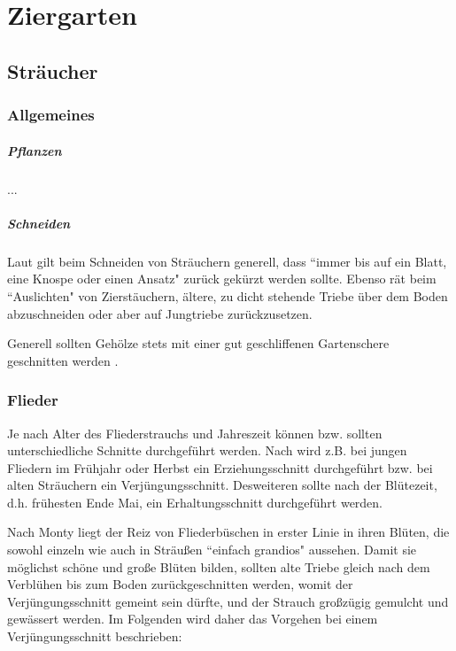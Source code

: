 \chapter{Ziergarten}

\pagebreak

\section{Sträucher}
\label{Sträucher}

\subsection{Allgemeines}

\paragraph{Pflanzen}

...

\paragraph{Schneiden}

Laut \citet[S.~257]{Don2021} gilt beim Schneiden von Sträuchern generell, dass ``immer bis auf ein Blatt, eine Knospe oder einen Ansatz" zurück gekürzt werden sollte.
Ebenso rät \citet[S.~256]{Stangl1995} beim ``Auslichten" von Zierstäuchern, ältere, zu dicht stehende Triebe über dem Boden abzuschneiden oder aber auf Jungtriebe zurückzusetzen.

Generell sollten Gehölze stets mit einer gut geschliffenen Gartenschere geschnitten werden \citep[S.~257]{Don2021}.

\subsection{Flieder}

Je nach Alter des Fliederstrauchs und Jahreszeit können bzw. sollten unterschiedliche Schnitte durchgeführt werden.
Nach \citet{Siemens2021} \cite{Siemens2021} wird z.B. bei jungen Fliedern im Frühjahr oder Herbst ein Erziehungsschnitt durchgeführt bzw. bei alten Sträuchern ein Verjüngungsschnitt.
Desweiteren sollte nach der Blütezeit, d.h. frühesten Ende Mai, ein Erhaltungsschnitt durchgeführt werden.

Nach Monty \citet[S.~258]{Don2021} liegt der Reiz von Fliederbüschen in erster Linie in ihren Blüten, die sowohl einzeln wie auch in Sträußen ``einfach grandios" aussehen.
Damit sie möglichst schöne und große Blüten bilden, sollten alte Triebe gleich nach dem Verblühen bis zum Boden zurückgeschnitten werden, womit der Verjüngungsschnitt gemeint sein dürfte, und der Strauch großzügig gemulcht und gewässert werden.
Im Folgenden wird daher das Vorgehen bei einem Verjüngungsschnitt beschrieben:

